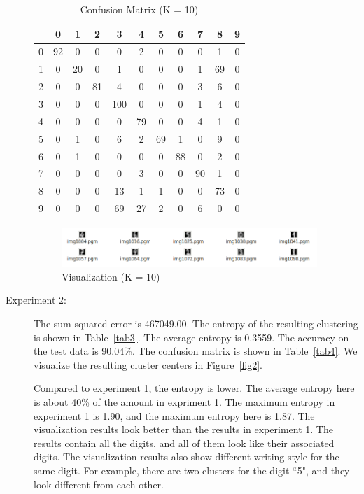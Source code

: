 \documentclass[11pt,letterpaper,oneside]{article}
\begin{document}
\begin{description}
\begin{table}[th]
\caption{Confusion Matrix (K = 10)}
\centering
\begin{tabular*}{0.6\textwidth}{@{\extracolsep{\fill}}ccccccccccc}
\hline
 & 0 & 1 & 2 & 3 & 4 & 5 & 6 & 7 & 8 & 9 \\ \hline
0& 92&  0&  0&  0&  2&  0&  0&  0&  1&  0\\
1& 0& 20&  0&  1&  0&  0&  0&  1& 69&  0\\
2& 0&  0& 81&  4&  0&  0&  0&  3&  6&  0\\
3& 0&   0&   0& 100&   0&   0&   0&   1&   4&   0\\
4& 0&  0&  0&  0& 79&  0&  0&  4&  1&  0\\
5& 0&  1&  0&  6&  2& 69&  1&  0&  9&  0\\
6& 0&  1&  0&  0&  0&  0& 88&  0&  2&  0\\
7& 0&  0&  0&  0&  3&  0&  0& 90&  1&  0\\
8& 0&  0&  0& 13&  1&  1&  0&  0& 73&  0\\
9& 0&  0&  0& 69& 27&  2&  0&  6&  0&  0\\
\hline
\end{tabular*}
\label{tab2}
\end{table}

\begin{figure}
\begin{center}
\includegraphics[width=0.95\textwidth]{fig1}
\caption{Visualization (K = 10)}
\label{fig1}
\end{center}
\end{figure}

\item[Experiment 2:] The sum-squared error is 467049.00. The entropy of the resulting clustering is shown in Table~\ref{tab3}. The average entropy is 0.3559. The accuracy on the test data is 90.04\%. The confusion matrix is shown in Table~\ref{tab4}. We visualize the resulting cluster centers in Figure~\ref{fig2}.

Compared to experiment 1, the entropy is lower. The average entropy here is about 40\% of the amount in expriment 1. The maximum entropy in experiment 1 is 1.90, and the maximum entropy here is 1.87. The visualization results look better than the results in experiment 1. The results contain all the digits, and all of them look like their associated digits. The visualization results also show different writing style for the same digit. For example, there are two clusters for the digit ``5", and they look different from each other.


\end{description}
\end{document}
